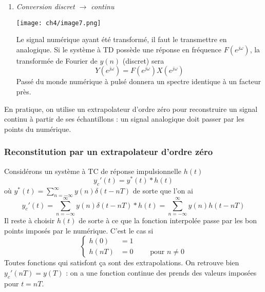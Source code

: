 \begin{enumerate}
	\item \textit{Conversion discret $\rightarrow$ continu}
\begin{center}
		\texttt{[image: ch4/image7.png]}
\end{center}
	Le signal numérique ayant été transformé, il faut le transmettre en analogique. Si le système à 
	TD possède une réponse en fréquence $F(e^{j\omega})$, la transformée de Fourier de $y(n)$ (discret) 
	sera
	\begin{equation}
	Y(e^{j\omega}) = F(e^{j\omega})X(e^{j\omega})
	\end{equation}
	Passé du monde numérique à pulsé donnera un spectre identique à un facteur près.
	\end{enumerate}
	
	En pratique, on utilise un extrapolateur d'ordre zéro pour reconstruire un signal continu à 
	partir de ses échantillons : un signal analogique doit passer par les points du numérique.
	
		\subsubsection{Reconstitution par un extrapolateur d'ordre zéro}
		Considérons un système à TC de réponse impulsionnelle $h(t)$
		\begin{equation}
		y_c'(t) = y^*(t)*h(t)
		\end{equation}
		où $y^*(t) = \sum_{n=-\infty}^\infty y(n)\delta(t-nT)$ de sorte que l'on ai
		\begin{equation}
		y_c'(t) = \sum_{n=-\infty}^\infty y(n)\delta(t-nT)*h(t) = \sum_{n=-\infty}^\infty y(n)
		h(t-nT)
		\end{equation}
		Il reste à choisir $h(t)$ de sorte à ce que la fonction interpolée passe par les bon 
		points imposés par le numérique. C'est le cas si
		\begin{equation}
		\left\{\begin{array}{ll}
		h(0) &= 1\\
		h(nT) &= 0\qquad \text{ pour } n \neq 0
		\end{array}\right.
		\end{equation}
		Toutes fonctions qui satisfont ça sont des extrapolations. On retrouve bien $y_c'(nT)=y(T)$ 
		: on a une fonction continue des prends des valeurs imposées pour $t=nT$.
		
		\ 
		
